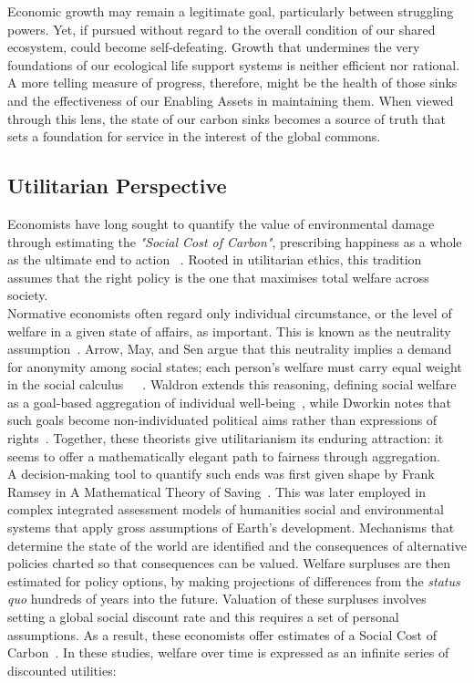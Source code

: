 Economic growth may remain a legitimate goal, particularly between struggling powers.
Yet, if pursued without regard to the overall condition of our shared ecosystem, could become self-defeating.
Growth that undermines the very foundations of our ecological life support systems is neither efficient nor rational.
A more telling measure of progress, therefore, might be the health of those sinks and the effectiveness of our Enabling Assets in maintaining them.
When viewed through this lens, the state of our carbon sinks becomes a source of truth that sets a foundation for service in the interest of the global commons.\\

\subsection{Utilitarian Perspective}

Economists have long sought to quantify the value of environmental damage through estimating the \emph{"Social Cost of Carbon"}, prescribing happiness as a whole as the ultimate end to action ~\cite{hs1}.
Rooted in utilitarian ethics, this tradition assumes that the right policy is the one that maximises total welfare across society.\\

Normative economists often regard only individual circumstance, or the level of welfare in a given state of affairs, as important.
This is known as the neutrality assumption~\cite{pd2}.
Arrow, May, and Sen argue that this neutrality implies a demand for anonymity among social states; each person’s welfare must carry equal weight in the social calculus~\cite{ka1}~\cite{km1}~\cite{as2}.
Waldron extends this reasoning, defining social welfare as a goal-based aggregation of individual well-being~\cite{jw2}, while Dworkin notes that such goals become non-individuated political aims rather than expressions of rights~\cite{rd1}.
Together, these theorists give utilitarianism its enduring attraction: it seems to offer a mathematically elegant path to fairness through aggregation.\\

A decision-making tool to quantify such ends was first given shape by Frank Ramsey in A Mathematical Theory of Saving~\cite{fr1}.
This was later employed in complex integrated assessment models of humanities social and environmental systems that apply gross assumptions of Earth's development.
Mechanisms that determine the state of the world are identified and the consequences of alternative policies charted so that consequences can be valued.
Welfare surpluses are then estimated for policy options, by making projections of differences from the \emph{status quo} hundreds of years into the future.
Valuation of these surpluses involves setting a global social discount rate and this requires a set of personal assumptions.
As a result, these economists offer estimates of a Social Cost of Carbon~\cite{pd2}.
In these studies, welfare over time is expressed as an infinite series of discounted utilities:\\


